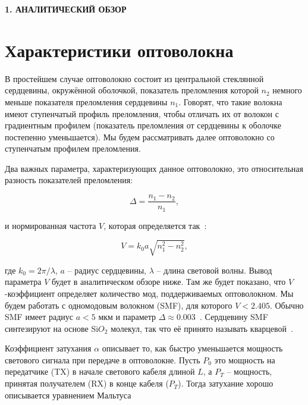 \newpage
\begin{center}
	\textbf{\large 1. АНАЛИТИЧЕСКИЙ ОБЗОР}
\end{center}

\newcommand{\divg}{\mathop{\mathrm{div}}\nolimits}
\newcommand{\rot}{\mathop{\mathrm{rot}}\nolimits}
\newcommand{\Ree}{\mathrm{Re}}
\newcommand{\Imm}{\mathrm{Im}}

\section{Характеристики оптоволокна}

В простейшем случае оптоволокно состоит из центральной стеклянной сердцевины, окружённой оболочкой, показатель преломления которой $n_2$ немного меньше показателя преломления сердцевины $n_1$.
Говорят, что такие волокна имеют ступенчатый профиль преломления, чтобы отличать их от волокон с градиентным профилем (показатель преломления от сердцевины к оболочке постепенно уменьшается).
Мы будем рассматривать далее оптоволокно со ступенчатым профилем преломления.

Два важных параметра, характеризующих данное оптоволокно, это относительная разность показателей преломления:

\begin{equation}
	\Delta = \frac{n_1 - n_2}{n_1},
\end{equation}

и нормированная частота $V$, которая определяется так~\cite{buck2004fundamentals}:

\begin{equation}
	V = k_0 a \sqrt{n_1^2 - n_2^2},
\end{equation}

где $k_0 = {2\pi}/{\lambda}$, $a$ -- радиус сердцевины, $\lambda$ -- длина световой волны. Вывод параметра $V$ будет в аналитическом обзоре ниже.
Там же будет показано, что $V$-коэффициент определяет количество мод, поддерживаемых оптоволокном. Мы будем работать с одномодовым волокном (SMF), для которого $V<2.405$.
Обычно SMF имеет радиус $a < 5$ мкм и параметр $\Delta \approx 0.003$~\cite{agrawal2007nonlinear}.
Сердцевину SMF синтезируют на основе Si$O_2$ молекул, так что её принято называть кварцевой~\cite{agrawal2007nonlinear}.

Коэффициент затухания $\alpha$ описывает то, как быстро уменьшается мощность светового сигнала при передаче в оптоволокне.
Пусть $P_0$ это мощность на передатчике (TX) в начале светового кабеля длиной $L$, а $P_T$ -- мощность, принятая получателем (RX) в конце кабеля ($P_T$).
Тогда затухание хорошо описывается уравнением Мальтуса

